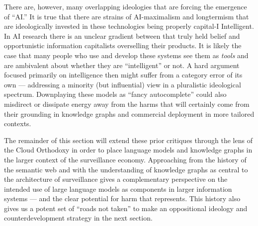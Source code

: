 There are, however, many overlapping ideologies that are forcing the
emergence of ``AI.'' It is true that there are strains of AI-maximalism
and longtermism that are ideologically invested in these technologies being
properly capital-I Intelligent. In AI research there is an unclear
gradient between that truly held belief and opportunistic information
capitalists overselling their products. It is likely
the case that many people who use and develop these systems see them as
\emph{tools} and are ambivalent about whether they are ``intelligent''
or not. A hard argument focused primarily on intelligence then might
suffer from a category error of its own --- addressing a minority (but
influential) view in a pluralistic ideological spectrum. Downplaying
these models as ``fancy autocomplete'' could also misdirect or dissipate
energy away from the harms that will certainly come from their grounding
in knowledge graphs and commercial deployment in more tailored contexts.

The remainder of this section will extend these prior critiques through
the lens of the Cloud Orthodoxy in order to place language models and
knowledge graphs in the larger context of the surveillance economy.
Approaching from the history of the semantic web and with the
understanding of knowledge graphs as central to the architecture of
surveillance gives a complementary perspective on the intended use of
large language models as components in larger information systems ---
and the clear potential for harm that represents. This history also
gives us a potent set of ``roads not taken'' to make an oppositional
ideology and counterdevelopment strategy in the next section.

